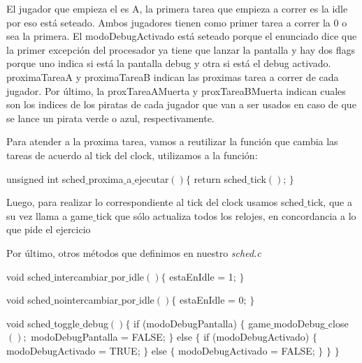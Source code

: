 El jugador que empieza el es A, la primera tarea que empieza a correr es la idle por eso está seteado. Ambos jugadores tienen como primer tarea a correr la 0 o sea la primera. El modoDebugActivado está seteado porque el enunciado dice que la primer excepción del procesador ya tiene que lanzar la pantalla y hay dos flags porque uno indica si está la pantalla debug y otra si está el debug activado.
proximaTareaA y proximaTareaB indican las proximas tarea a correr de cada jugador. Por último, la proxTareaAMuerta y proxTareaBMuerta indican cuales son los indices de los piratas de cada jugador que van a ser usados en caso de que se lance un pirata verde o azul, respectivamente.

Para atender a la proxima tarea, vamos a reutilizar la funci\'on que cambia las tareas de acuerdo al tick del clock, utilizamos a la funci\'on:
\begin{algorithmic}
    \State \tab unsigned int sched$\_$proxima$\_$a$\_$ejecutar$() \{$
    \State \tab \tab return sched$\_$tick$()$;
    \State \tab $\}$
\end{algorithmic}

Luego, para realizar lo correspondiente al tick del clock usamos sched$\_$tick, que a su vez llama a game$\_$tick que sólo actualiza todos los relojes, en concordancia a lo que pide el ejercicio


Por \'ultimo, otros m\'etodos que definimos en nuestro \textit{sched.c}
\begin{algorithmic}
    \State \tab void sched$\_$intercambiar$\_$por$\_$idle$() \{$
        \State \tab \tab estaEnIdle = 1;
    \State \tab $\}$
\end{algorithmic}

\begin{algorithmic}
    \State \tab void sched$\_$nointercambiar$\_$por$\_$idle$() \{$
        \State \tab \tab estaEnIdle = 0;
    \State \tab $\}$
\end{algorithmic}

\begin{algorithmic}
    \State \tab void sched$\_$toggle$\_$debug$() \{$
        \State \tab \tab if (modoDebugPantalla) $\{$
        \State \tab \tab \tab game$\_$modoDebug$\_$close$();$
        \State \tab \tab \tab modoDebugPantalla = FALSE;
        \State \tab \tab $\}$ else $\{$
        \State \tab \tab \tab if (modoDebugActivado) $\{$
        \State \tab \tab \tab \tab modoDebugActivado = TRUE;
        \State \tab \tab \tab $\}$ else $\{$
        \State \tab \tab \tab \tab modoDebugActivado = FALSE;
        \State \tab \tab	\tab $\}$
        \State \tab \tab $\}$
    \State \tab $\}$
\end{algorithmic}

